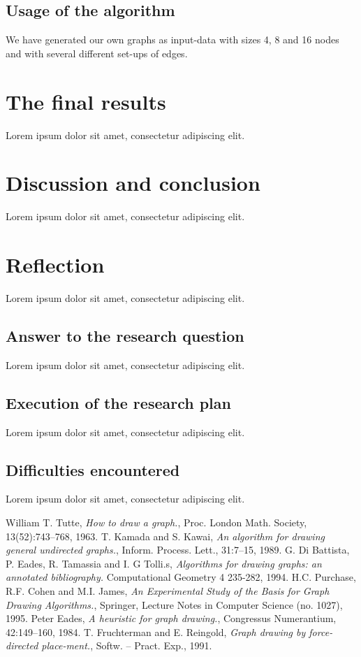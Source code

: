 \documentclass[a4paper,12pt,twoside]{article}
\begin{document}
\subsection{Usage of the algorithm}
We have generated our own graphs as input-data with sizes 4, 8 and 16 nodes and with several different set-ups of edges.

\section{The final results}
Lorem ipsum dolor sit amet, consectetur adipiscing elit.

\section{Discussion and conclusion}
Lorem ipsum dolor sit amet, consectetur adipiscing elit.

\section{Reflection}
Lorem ipsum dolor sit amet, consectetur adipiscing elit.
\subsection{Answer to the research question}
Lorem ipsum dolor sit amet, consectetur adipiscing elit.
\subsection{Execution of the research plan}
Lorem ipsum dolor sit amet, consectetur adipiscing elit.\subsection{Difficulties encountered}
Lorem ipsum dolor sit amet, consectetur adipiscing elit.

\begin{thebibliography}{99}
William T. Tutte, \emph{How to draw a graph.}, Proc. London Math. Society, 13(52):743–768, 1963.
T. Kamada and S. Kawai, \emph{An algorithm for drawing general undirected graphs.}, Inform. Process. Lett., 31:7–15, 1989.
G. Di Battista, P. Eades, R. Tamassia and I. G Tolli.s, \emph{Algorithms for drawing graphs: an annotated bibliography.} Computational Geometry 4 235-282, 1994.
H.C. Purchase, R.F. Cohen and M.I. James, \emph{An Experimental Study of the Basis for Graph Drawing Algorithms.}, Springer, Lecture Notes in Computer Science (no. 1027), 1995.
 Peter Eades, \emph{A heuristic for graph drawing.}, Congressus Numerantium, 42:149–160, 1984.
T. Fruchterman and E. Reingold, \emph{Graph drawing by force-directed place-ment.}, Softw. – Pract. Exp., 1991.
\end{thebibliography}
\end{document}
